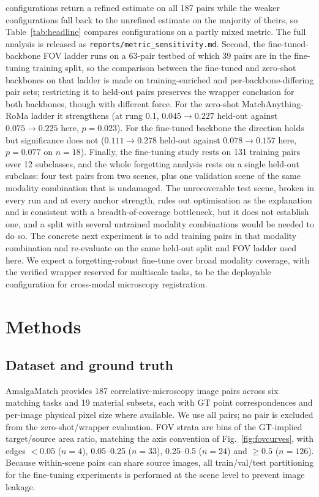 \documentclass[fleqn,10pt]{wlscirep}
\begin{document}
configurations return a refined estimate on all 187 pairs while the weaker configurations fall back to the unrefined estimate on the majority of theirs, so Table~\ref{tab:headline} compares configurations on a partly mixed metric. The full analysis is released as \texttt{reports/metric\_sensitivity.md}. Second, the fine-tuned-backbone FOV ladder runs on a 63-pair testbed of which 39 pairs are in the fine-tuning training split, so the comparison between the fine-tuned and zero-shot backbones on that ladder is made on training-enriched and per-backbone-differing pair sets; restricting it to held-out pairs preserves the wrapper conclusion for both backbones, though with different force. For the zero-shot MatchAnything-RoMa ladder it strengthens (at rung 0.1, $0.045\rightarrow0.227$ held-out against $0.075\rightarrow0.225$ here, $p=0.023$). For the fine-tuned backbone the direction holds but significance does not ($0.111\rightarrow0.278$ held-out against $0.078\rightarrow0.157$ here, $p=0.077$ on $n=18$). Finally, the fine-tuning study rests on 131 training pairs over 12 subclasses, and the whole forgetting analysis rests on a single held-out subclass: four test pairs from two scenes, plus one validation scene of the same modality combination that is undamaged. The unrecoverable test scene, broken in every run and at every anchor strength, rules out optimisation as the explanation and is consistent with a breadth-of-coverage bottleneck, but it does not establish one, and a split with several untrained modality combinations would be needed to do so. The concrete next experiment is to add training pairs in that modality combination and re-evaluate on the same held-out split and FOV ladder used here. We expect a forgetting-robust fine-tune over broad modality coverage, with the verified wrapper reserved for multiscale tasks, to be the deployable configuration for cross-modal microscopy registration.

\section*{Methods}

\subsection*{Dataset and ground truth}

AmalgaMatch\cite{durmaz2026amalgamatch} provides 187 correlative-microscopy image pairs across six matching tasks and 19 material subsets, each with GT point correspondences and per-image physical pixel size where available. We use all pairs; no pair is excluded from the zero-shot/wrapper evaluation. FOV strata are bins of the GT-implied target/source area ratio, matching the axis convention of Fig.~\ref{fig:fovcurves}, with edges $<0.05$ ($n=4$), 0.05--0.25 ($n=33$), 0.25--0.5 ($n=24$) and $\ge0.5$ ($n=126$). Because within-scene pairs can share source images, all train/val/test partitioning for the fine-tuning experiments is performed at the scene level to prevent image leakage.
\end{document}
